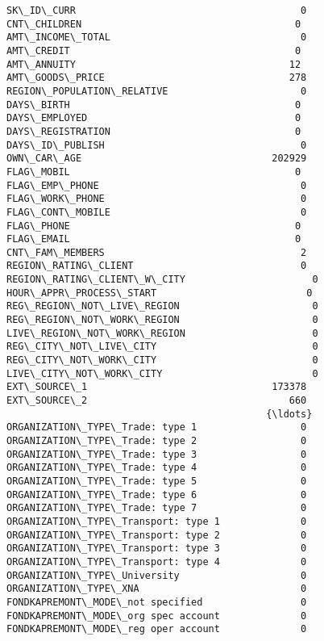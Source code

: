 \documentclass[11pt]{article}
\begin{document}
    \begin{Verbatim}[commandchars=\\\{\}]
SK\_ID\_CURR                                       0
CNT\_CHILDREN                                     0
AMT\_INCOME\_TOTAL                                 0
AMT\_CREDIT                                       0
AMT\_ANNUITY                                     12
AMT\_GOODS\_PRICE                                278
REGION\_POPULATION\_RELATIVE                       0
DAYS\_BIRTH                                       0
DAYS\_EMPLOYED                                    0
DAYS\_REGISTRATION                                0
DAYS\_ID\_PUBLISH                                  0
OWN\_CAR\_AGE                                 202929
FLAG\_MOBIL                                       0
FLAG\_EMP\_PHONE                                   0
FLAG\_WORK\_PHONE                                  0
FLAG\_CONT\_MOBILE                                 0
FLAG\_PHONE                                       0
FLAG\_EMAIL                                       0
CNT\_FAM\_MEMBERS                                  2
REGION\_RATING\_CLIENT                             0
REGION\_RATING\_CLIENT\_W\_CITY                      0
HOUR\_APPR\_PROCESS\_START                          0
REG\_REGION\_NOT\_LIVE\_REGION                       0
REG\_REGION\_NOT\_WORK\_REGION                       0
LIVE\_REGION\_NOT\_WORK\_REGION                      0
REG\_CITY\_NOT\_LIVE\_CITY                           0
REG\_CITY\_NOT\_WORK\_CITY                           0
LIVE\_CITY\_NOT\_WORK\_CITY                          0
EXT\_SOURCE\_1                                173378
EXT\_SOURCE\_2                                   660
                                             {\ldots}  
ORGANIZATION\_TYPE\_Trade: type 1                  0
ORGANIZATION\_TYPE\_Trade: type 2                  0
ORGANIZATION\_TYPE\_Trade: type 3                  0
ORGANIZATION\_TYPE\_Trade: type 4                  0
ORGANIZATION\_TYPE\_Trade: type 5                  0
ORGANIZATION\_TYPE\_Trade: type 6                  0
ORGANIZATION\_TYPE\_Trade: type 7                  0
ORGANIZATION\_TYPE\_Transport: type 1              0
ORGANIZATION\_TYPE\_Transport: type 2              0
ORGANIZATION\_TYPE\_Transport: type 3              0
ORGANIZATION\_TYPE\_Transport: type 4              0
ORGANIZATION\_TYPE\_University                     0
ORGANIZATION\_TYPE\_XNA                            0
FONDKAPREMONT\_MODE\_not specified                 0
FONDKAPREMONT\_MODE\_org spec account              0
FONDKAPREMONT\_MODE\_reg oper account              0

\end{Verbatim}
\end{document}
